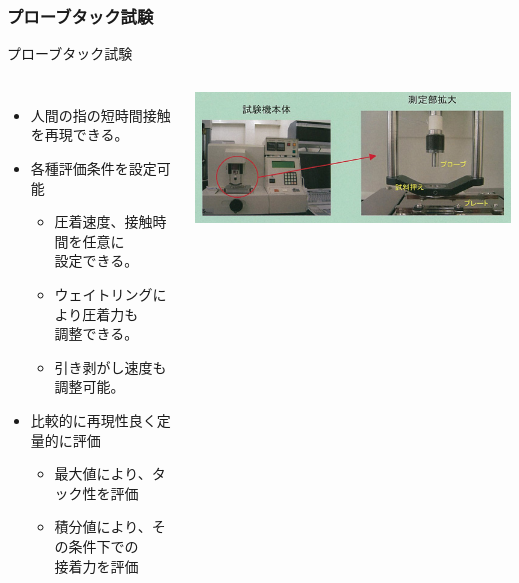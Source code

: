 \documentclass[unicode,12pt]{beamer}%
\begin{document}
\begin{frame}
	\frametitle{プローブタック試験}
	\begin{block}{プローブタック試験}
		\begin{columns}[c, onlytextwidth]
			
				\begin{itemize}
					\item 人間の指の短時間接触を再現できる。
					\item 各種評価条件を設定可能
					\begin{itemize}
						\item 圧着速度、接触時間を任意に\\設定できる。
						\item ウェイトリングにより圧着力も\\調整できる。
						\item 引き剥がし速度も調整可能。
					\end{itemize}
					\item 比較的に再現性良く定量的に評価
					\begin{itemize}
						\item 最大値により、タック性を評価
						\item 積分値により、その条件下での\\接着力を評価
					\end{itemize}
				\end{itemize}
			
			\centering
			\includegraphics[width=\textwidth]{probtack_1.jpg}


\end{columns}
\end{block}
\end{frame}
\end{document}
